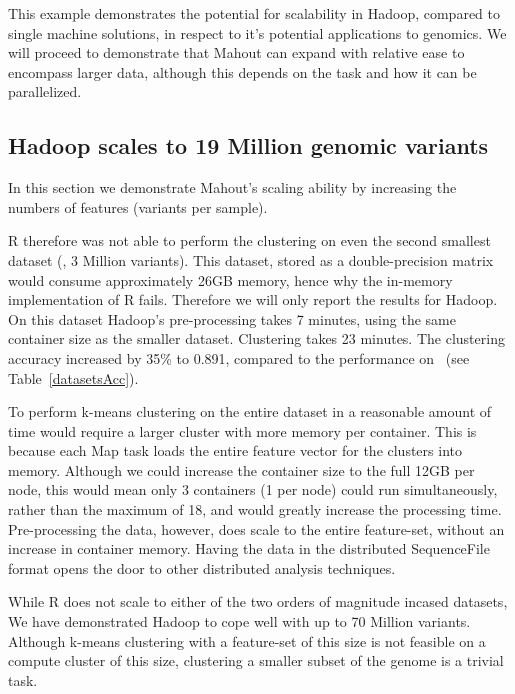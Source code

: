 \documentclass{bioinfo}
\begin{document}
This example demonstrates the potential for scalability in Hadoop, compared to single machine solutions, in respect to it's potential applications to genomics. We will proceed to demonstrate that Mahout can expand with relative ease to encompass larger data, although this depends on the task and how it can be parallelized.


\subsection*{Hadoop scales to 19 Million genomic variants}
In this section we demonstrate Mahout's scaling ability by increasing the numbers of features (variants per sample).



R therefore was not able to perform the clustering on even the second smallest dataset (\OnePhaseone , 3 Million variants). This dataset, stored as a double-precision matrix would consume approximately 26GB memory, hence why the in-memory implementation of R fails. Therefore we will only
report the results for Hadoop.
On this dataset Hadoop's pre-processing takes 7 minutes, using the same container size as the smaller dataset. Clustering takes 23 minutes.
The clustering accuracy increased by 35\% to 0.891, compared to the performance on \NinteenPhaseone\ (see Table~\ref{datasetsAcc}).

To perform k-means clustering on the entire dataset in a reasonable amount of time would require a larger cluster with more memory per container.
This is because each Map task loads the entire feature vector for the clusters into memory.
Although we could increase the container size to the full 12GB per node, this would mean only 3 containers (1 per node) could run simultaneously, rather than the maximum of 18, and would greatly increase the processing time.
Pre-processing the data, however, does scale to the entire feature-set, without an increase in container memory. Having the data in the distributed
SequenceFile format opens the door to other distributed analysis techniques.

While R does not scale to either of the two orders of magnitude incased datasets, We have demonstrated Hadoop to cope well with up to 70 Million variants. Although k-means clustering with a feature-set of this size is not feasible on a compute cluster of this size, clustering a smaller subset of the genome is a trivial task.

\end{document}
